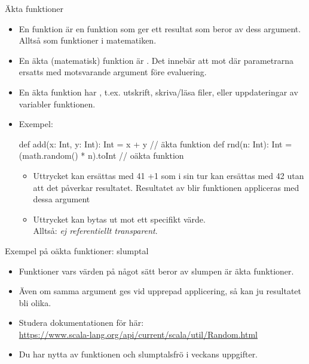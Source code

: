\begin{Slide}{Äkta funktioner}
\begin{itemize}\SlideFontSmall
\item En   funktion är en funktion som ger ett resultat som  beror av dess argument. Alltså som funktioner i matematiken.
\item En äkta (matematisk) funktion är  . Det innebär att   mot   där parametrarna ersatts med motsvarande argument före evaluering.
\item En äkta funktion har , t.ex. utskrift, skriva/läsa filer,  eller uppdateringar av variabler  funktionen.
\item Exempel:
\begin{Code}
def add(x: Int, y: Int): Int = x + y              // äkta funktion
def rnd(n: Int): Int = (math.random() * n).toInt  // oäkta funktion
\end{Code} 
\begin{itemize}\SlideFontTiny

\item Uttrycket  kan ersättas med 41 +1 som i sin tur kan ersättas med 42 utan att det påverkar resultatet. Resultatet av  blir  funktionen appliceras med dessa argument
\item Uttrycket  kan  bytas ut mot ett specifikt värde. \\Alltså: \emph{ej referentiellt transparent}.
\end{itemize}  
\end{itemize}  
\end{Slide}

\begin{Slide}{Exempel på oäkta funktioner: slumptal}

  \begin{itemize}
    \item Funktioner vars värden på något sätt beror av slumpen är  äkta funktioner.
    \item Även om samma argument ges vid upprepad applicering, så kan ju resultatet bli olika.
    \item Studera dokumentationen för  här:\\ \href{https://www.scala-lang.org/api/current/scala/util/Random.html}{\SlideFontSmall https://www.scala-lang.org/api/current/scala/util/Random.html}
    \item Du har nytta av funktionen  och slumptalsfrö  i veckans uppgifter.
  \end{itemize}

\end{Slide}


